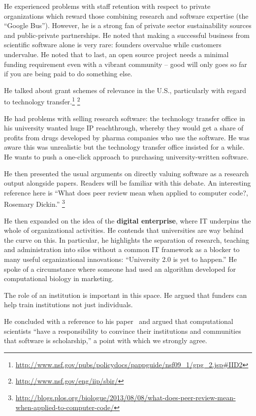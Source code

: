 \documentclass[11pt, oneside]{amsart}
\begin{document}
He experienced problems with staff retention with respect to private organizations which reward 
those combining research and software expertise (the ``Google Bus''). However,
he is a strong fan of private sector sustainability sources and public-private partnerships. He
noted that making a successful business from scientific software alone
is very rare: founders overvalue while customers undervalue. He noted
that to last, an open source project needs a minimal funding requirement
even with a vibrant community -- good will only goes so far if you are
being paid to do something else.

He talked about grant schemes of relevance in the U.S., particularly with regard to technology transfer.\footnote{\url{http://www.nsf.gov/pubs/policydocs/pappguide/nsf09_1/gpg_2.jsp\#IID2}} \footnote{\url{http://www.nsf.gov/eng/iip/sbir/}}

He had problems with selling research software: the technology transfer
office in his university wanted huge IP reachthrough, whereby they would get a
share of profits from drugs developed by pharma companies who use the
software. He was aware this was unrealistic but the technology transfer
office insisted for a
while. He wants to push a one-click approach to purchasing
university-written software. 

He then presented the usual arguments on directly valuing software as a
research output alongside papers. Readers will be familiar with this
debate. An interesting reference here is ``What
does peer review mean when applied to computer code?, Rosemary Dickin.''
\footnote{\url{http://blogs.plos.org/biologue/2013/08/08/what-does-peer-review-mean-when-applied-to-computer-code/}}

He then expanded on the idea of the \textbf{digital enterprise}, where
IT underpins the whole of organizational activities. He contends that
universities are way behind the curve on this. In particular, he
highlights the separation of research, teaching and administration into
silos without a common IT framework as a blocker to many useful
organizational innovations: ``University 2.0 is yet to happen.'' He
spoke of a circumstance where someone had used an algorithm developed
for computational biology in marketing.

The role of an institution is important in this space. He argued that
funders can help train institutions not just individuals.

He concluded with a reference to his paper~\cite{bourne_ten} and argued that computational scientists ``have a
responsibility to convince their institutions and communities that
software is scholarship,'' a point with which we strongly agree.
\end{document}
